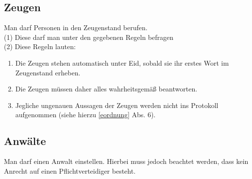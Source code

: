 \documentclass{article}
\begin{document}
\subsection{Zeugen}\label{zeugen}
Man darf Personen in den Zeugenstand berufen.\\
(1) Diese darf man unter den gegebenen Regeln befragen  \\
(2) Diese Regeln lauten:  \\
\begin{enumerate}
	\item Die Zeugen stehen automatisch unter Eid, sobald sie ihr erstes Wort im Zeugenstand erheben.
	\item Die Zeugen müssen daher alles wahrheitsgemäß beantworten.
	\item Jegliche ungenauen Aussagen der Zeugen werden nicht ins Protokoll aufgenommen (siehe hierzu \ref{eordnung} Abs. 6).
\end{enumerate}

\subsection{Anwälte}
Man darf einen Anwalt einstellen. Hierbei muss jedoch beachtet werden, dass kein Anrecht auf einen Pflichtverteidiger besteht.
\end{document}
